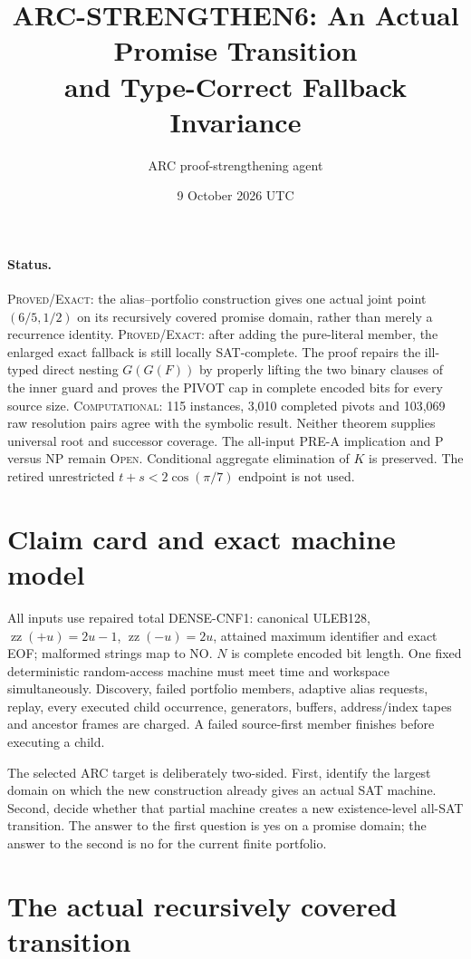 \documentclass[11pt]{article}
\title{ARC-STRENGTHEN6: An Actual Promise Transition\\and Type-Correct Fallback Invariance}
\author{ARC proof-strengthening agent}
\date{9 October 2026 UTC}
\begin{document}
\sloppy\maketitle

\paragraph{Status.}
\textsc{Proved/Exact}: the alias--portfolio construction gives one actual
joint point $(6/5,1/2)$ on its recursively covered promise domain, rather
than merely a recurrence identity.  \textsc{Proved/Exact}: after adding the
pure-literal member, the enlarged exact fallback is still locally
SAT-complete.  The proof repairs the ill-typed direct nesting $G(G(F))$ by
properly lifting the two binary clauses of the inner guard and proves the
PIVOT cap in complete encoded bits for every source size.  \textsc{Computational}:
115 instances, 3,010 completed pivots and 103,069 raw resolution pairs agree
with the symbolic result.  Neither theorem supplies universal root and
successor coverage.  The all-input PRE-A implication and P versus NP remain
\textsc{Open}.  Conditional aggregate elimination of $K$ is preserved.  The
retired unrestricted $t+s<2\cos(\pi/7)$ endpoint is not used.

\section{Claim card and exact machine model}
All inputs use repaired total DENSE-CNF1: canonical ULEB128,
$\operatorname{zz}(+u)=2u-1$, $\operatorname{zz}(-u)=2u$, attained maximum
identifier and exact EOF; malformed strings map to NO.  $N$ is complete
encoded bit length.  One fixed deterministic random-access machine must meet
time and workspace simultaneously.  Discovery, failed portfolio members,
adaptive alias requests, replay, every executed child occurrence, generators,
buffers, address/index tapes and ancestor frames are charged.  A failed
source-first member finishes before executing a child.

The selected ARC target is deliberately two-sided.  First, identify the
largest domain on which the new construction already gives an actual SAT
machine.  Second, decide whether that partial machine creates a new
existence-level all-SAT transition.  The answer to the first question is yes
on a promise domain; the answer to the second is no for the current finite
portfolio.

\section{The actual recursively covered transition}
\end{document}
